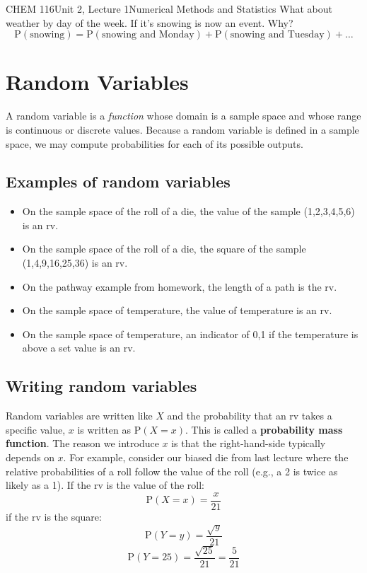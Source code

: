 \documentclass{article}
\renewcommand{\Pr}{\textrm{P}}
\begin{document}
\begin{tdoc}{CHEM 116}{Unit 2, Lecture 1}{Numerical Methods and Statistics}
What about weather by day of the week. If it's snowing is now an
event. Why?
\[
\Pr(\textrm{snowing}) = \Pr(\textrm{snowing and Monday}) + \Pr(\textrm{snowing and Tuesday}) + \ldots
\]

\section{Random Variables}

A random variable is a \emph{function} whose domain is a sample space
and whose range is continuous or discrete values. Because a random
variable is defined in a sample space, we may compute probabilities
for each of its possible outputs.

\subsection{Examples of random variables}

\begin{itemize}

\item On the sample space of the roll of a die, the value of the
  sample (1,2,3,4,5,6) is an rv.


\item On the sample space of the roll of a die, the square of the
  sample (1,4,9,16,25,36) is an rv.

\item On the pathway example from homework, the
  length of a path is the rv.

\item On the sample space of temperature, the value of
  temperature is an rv.

\item On the sample space of temperature, an indicator of 0,1 if the
  temperature is above a set value is an rv.

\end{itemize}

\subsection{Writing random variables}

Random variables are written like $X$ and the probability that an rv
takes a specific value, $x$ is written as $\Pr(X=x)$. This is called a
{\bf probability mass function}. The reason we introduce $x$ is that
the right-hand-side typically depends on $x$. For example, consider
our biased die from last lecture where the relative probabilities of a
roll follow the value of the roll (e.g., a 2 is twice as likely as a
1). If the rv is the value of the roll:
\[
\Pr(X=x) = \frac{x}{21}
\]
if the rv is the square:
\[
\Pr(Y=y) = \frac{\sqrt{y}}{21}
\]
\[
\Pr(Y=25) = \frac{\sqrt{25}}{21} = \frac{5}{21}
\]


\end{tdoc}
\end{document}
